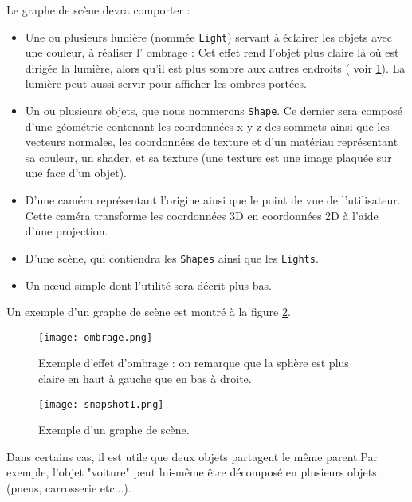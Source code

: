 \documentclass[11pt]{report}
\begin{document}
Le graphe de scène devra comporter : 
\begin{itemize}
\item Une ou plusieurs lumière (nommée \texttt{Light}) servant à éclairer les objets avec une couleur, à réaliser l' ombrage : Cet effet rend l'objet plus claire là où est dirigée la lumière, alors qu'il est plus sombre aux autres endroits ( voir \ref{ombrage}). La lumière peut aussi servir pour afficher les ombres portées.
\item Un ou plusieurs objets, que nous nommerons \texttt{Shape}. Ce dernier sera composé d'une géométrie contenant les coordonnées x y z des sommets ainsi que les vecteurs normales, les coordonnées de texture et d'un matériau représentant sa couleur, un shader, et sa texture (une texture est une image plaquée sur une face d'un objet).
\item D'une caméra représentant l'origine ainsi que le point de vue de l'utilisateur. Cette caméra transforme les coordonnées 3D en coordonnées 2D à l'aide d'une projection.
\item D'une scène, qui contiendra les \texttt{Shapes} ainsi que les \texttt{Lights}.
\item Un nœud simple dont l'utilité sera décrit plus bas.
\end{itemize}



Un exemple d'un graphe de scène est montré à la figure \ref{graphscene}.
\begin{figure}[h!]
  \caption{Exemple d'effet d'ombrage : on remarque que la sphère est plus claire en haut à gauche que en bas à droite.}
  \centering
\texttt{[image: ombrage.png]} 
\label{ombrage}
\end{figure}

\begin{figure}[h!]
  \caption{Exemple d'un graphe de scène.}
  \centering
\texttt{[image: snapshot1.png]} 
\label{graphscene}
\end{figure}

Dans certains cas, il est utile que deux objets partagent le même parent.Par exemple, l'objet "voiture" peut lui-même être décomposé en plusieurs objets (pneus, carrosserie etc...).\\
\end{document}
